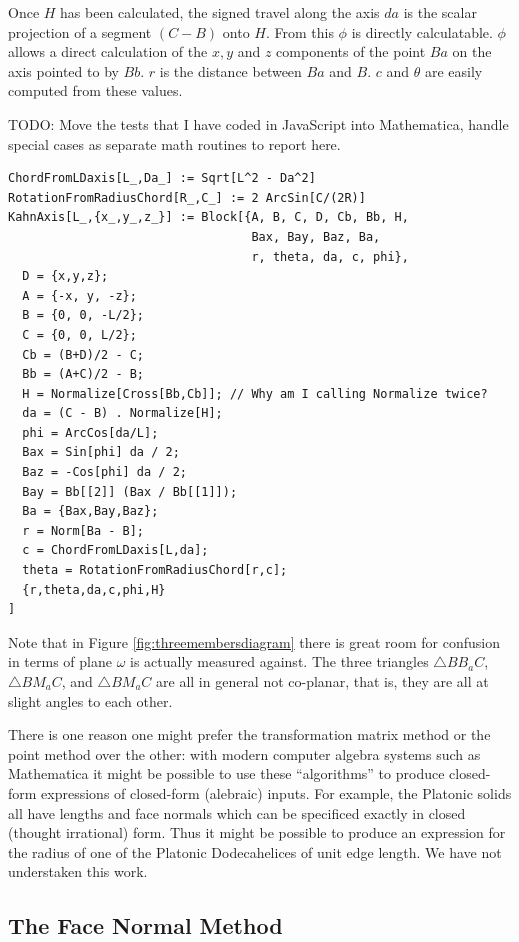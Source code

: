 \documentclass[11pt]{article}
\begin{document}
{Once $H$ has been calculated, the signed travel along the axis $da$ is
the scalar projection of a segment $(C - B)$ onto $H$.
From this $\phi$ is directly calculatable. $\phi$ allows
a direct calculation of the $x,y$ and $z$ components of the
point $Ba$ on the axis pointed to by $Bb$.
$r$ is the distance between $Ba$ and $B$. $c$ and $\theta$
are easily computed from these values.

TODO: Move the tests that I have coded in JavaScript into
Mathematica, handle special cases as separate math routines
to report here.

\begin{lstlisting}
ChordFromLDaxis[L_,Da_] := Sqrt[L^2 - Da^2]
RotationFromRadiusChord[R_,C_] := 2 ArcSin[C/(2R)]
KahnAxis[L_,{x_,y_,z_}] := Block[{A, B, C, D, Cb, Bb, H,
                                  Bax, Bay, Baz, Ba,
                                  r, theta, da, c, phi},
  D = {x,y,z};
  A = {-x, y, -z};
  B = {0, 0, -L/2};
  C = {0, 0, L/2};
  Cb = (B+D)/2 - C;
  Bb = (A+C)/2 - B;
  H = Normalize[Cross[Bb,Cb]]; // Why am I calling Normalize twice?
  da = (C - B) . Normalize[H];
  phi = ArcCos[da/L];
  Bax = Sin[phi] da / 2;
  Baz = -Cos[phi] da / 2;
  Bay = Bb[[2]] (Bax / Bb[[1]]);
  Ba = {Bax,Bay,Baz};
  r = Norm[Ba - B];
  c = ChordFromLDaxis[L,da];
  theta = RotationFromRadiusChord[r,c];
  {r,theta,da,c,phi,H}
]
\end{lstlisting}

Note that in Figure \ref{fig:threemembersdiagram} there is great
room for confusion in terms of plane $\omega$ is actually
measured against. The three triangles $\triangle BB_aC$, $\triangle BM_aC$, and $\triangle BM_aC$
are all in general not co-planar, that is, they are all at
slight angles to each other.

There is one reason one might prefer the transformation matrix method or the point method over the other: with modern
computer algebra systems such as Mathematica it might be possible to use these ``algorithms'' to produce closed-form
expressions of closed-form (alebraic) inputs. For example, the Platonic solids all have lengths and face normals which
can be specificed exactly in closed (thought irrational) form. Thus it might be possible to produce an expression for the
radius of one of the Platonic Dodecahelices of unit edge length. We have not understaken this work.


\subsection{The Face Normal Method}
\label{sec:facenormal}

}
\end{document}
